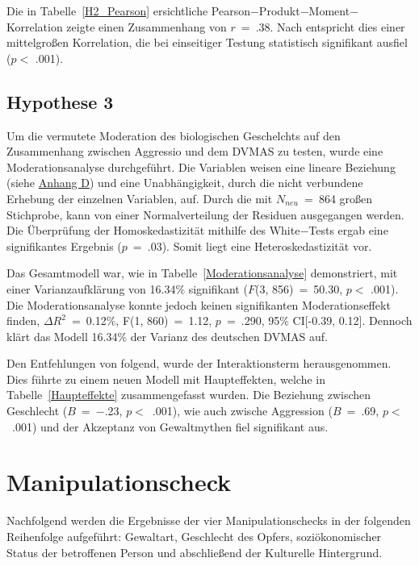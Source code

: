 Die in Tabelle~\ref{H2_Pearson} ersichtliche Pearson$-$Produkt$-$Moment$-$Korrelation zeigte einen Zusammenhang von $r$~=~.38. Nach \textcite{Cohen_1992} entspricht dies einer mittelgroßen Korrelation, die bei einseitiger Testung statistisch signifikant ausfiel ($p<$ .001).



\subsection{Hypothese 3}    \label{subsec_4.2.3}
Um die vermutete Moderation des biologischen Geschelchts auf den Zusammenhang zwischen Aggressio und dem DVMAS zu testen, wurde eine Moderationsanalyse durchgeführt. Die Variablen weisen eine lineare Beziehung (siehe \hyperref[Linearitat_sex_DVMAS]{Anhang D}) und eine Unabhängigkeit, durch die nicht verbundene Erhebung der einzelnen Variablen, auf. Durch die mit $N_{neu}$~=~864 großen Stichprobe, kann von einer Normalverteilung der Residuen ausgegangen werden. Die Überprüfung der Homoskedastizität mithilfe des White$-$Tests ergab eine signifikantes Ergebnis ($p$~=~.03). Somit liegt eine Heteroskedastizität vor. 


Das Gesamtmodell war, wie in Tabelle~\ref{Moderationsanalyse} demonstriert, mit einer Varianzaufklärung von 16.34\% signifikant ($F$(3, 856)~=~50.30, $p<$ .001). Die Moderationsanalyse konnte jedoch keinen signifikanten Moderationseffekt finden, $\Delta R^{2}$~=~0.12\%, F(1, 860)~=~1.12, $p$~=~.290, 95\% CI[-0.39, 0.12]. Dennoch klärt das Modell 16.34\% der Varianz des deutschen DVMAS auf.


Den Entfehlungen von \textcite{Moderation_SPSS} folgend, wurde der Interaktionsterm herausgenommen. Dies führte zu einem neuen Modell mit Haupteffekten, welche in Tabelle~\ref{Haupteffekte} zusammengefasst wurden. Die Beziehung zwischen Geschlecht ($B$~=~$-$.23, $p<$~.001), wie auch zwische Aggression ($B$~=~.69, $p<$~.001) und der Akzeptanz von Gewaltmythen fiel signifikant aus. 


\section{Manipulationscheck}    \label{sec_4.3}
Nachfolgend werden die Ergebnisse der vier Manipulationschecks in der folgenden Reihenfolge aufgeführt: Gewaltart, Geschlecht des Opfers, soziökonomischer Status der betroffenen Person und abschließend der Kulturelle Hintergrund.

